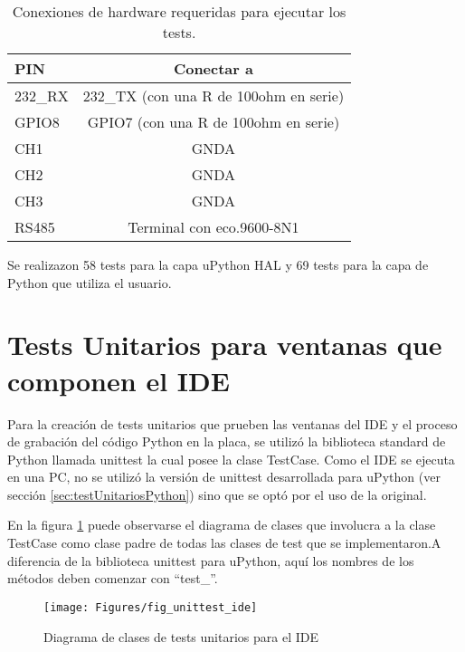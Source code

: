\begin{table}[h]
	\centering
	\caption[Conexiones de hardware requeridas para ejecutar los tests]{Conexiones de hardware requeridas para ejecutar los tests.}
	\begin{tabular}{l c}    
		\toprule
		\textbf{PIN} 	 	& \textbf{Conectar a}   									\\
		\midrule
		232\_RX	 				& 232\_TX (con una R de 100ohm en serie)		\\	
		GPIO8	 					& GPIO7 (con una R de 100ohm en serie)		\\		
		CH1	 						& GNDA																		\\		
		CH2	 						& GNDA																		\\		
		CH3	 						& GNDA																		\\		
		RS485						& Terminal con eco.9600-8N1								\\
		\bottomrule
		\hline
	\end{tabular}
	\label{tab:hardreq}
\end{table}

Se realizazon 58 tests para la capa uPython HAL y 69 tests para la capa de Python que utiliza el usuario.

\section{Tests Unitarios para ventanas que componen el IDE}
\label{sec:testUnitariosIDE}

Para la creación de tests unitarios que prueben las ventanas del IDE y el proceso de grabación del código Python en la placa, se utilizó la biblioteca standard de Python llamada unittest la cual posee la clase TestCase. Como el IDE se ejecuta en una PC, no se utilizó la versión de unittest desarrollada para uPython (ver sección \ref{sec:testUnitariosPython}) sino que se optó por el uso de la original.

En la figura \ref{fig:unittestide} puede observarse el diagrama de clases que involucra a la clase TestCase como clase padre de todas las clases de test que se implementaron.A diferencia de la biblioteca unittest para uPython, aquí los nombres de los métodos deben comenzar con “test\_”.

\begin{figure}[h]
  \centering
    \texttt{[image: Figures/fig\_unittest\_ide]}
  \caption{Diagrama de clases de tests unitarios para el IDE}
  \label{fig:unittestide}
\end{figure}

